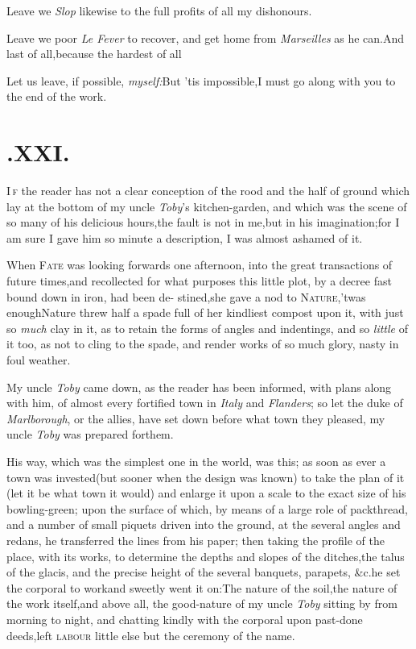 \documentclass{article}
\begin{document}
Leave we \textit{Slop} likewise to the full profits of all my
dishonours.\tsh

Leave we poor \textit{Le Fever} to recover, and get home from
\textit{Marseilles} as he can.\break\tsh And last of
all,\tsk because the hardest of all\tsh{}

Let us leave, if possible, \textit{myself:}\tsh But
’tis impossible,\tsk I must go along with you to the end of
the work.

\section{.\enspace XXI.}

\lettrine{I}{\,f} the reader has not a clear
conception of the rood and the half of ground which lay at the
bottom of my uncle \textit{Toby}’s kitchen-garden, and which
was the scene of so many of his delicious hours,\tsk the fault is
not in me,\tsk but in his imagination;\tsk for I am sure I gave
him so minute a description, I was almost ashamed of it.

When \textsc{Fate} was looking forwards one afternoon,
into the great transactions of future times,\tsk and recollected
for what purposes this little plot, by a decree fast bound down in
iron, had been de- stined,\tsk she gave a nod to
\textsc{Nature},\tsk ’twas enough\tsk Nature threw
half a spade full of her kindliest compost upon it, with just so
\textit{much} clay in it, as to retain the forms of angles and
indentings,\tsk\break
and so \textit{little} of it too, as not to cling
to the spade, and render works of so much glory, nasty in foul
weather.

My uncle \textit{Toby} came down, as the reader has been informed,
with plans along with him, of almost every fortified town in
\textit{Italy} and \textit{Flanders}; so let the duke of
\textit{Marlborough}, or the allies, have set down before what town
they pleased, my uncle \textit{Toby} was prepared for\break them.

His way, which was the simplest one in the world, was this; as
soon as ever a town was invested\tsk (but sooner when 
the design was known) to take the plan\break
of it (let it be what town it would)\break
and enlarge it upon a scale to the exact size of his bowling-green;
upon the surface of which, by means of a large role of packthread,
and a number of small piquets driven into the ground, at the
several angles and redans, he transferred the lines from his paper;
then taking the profile of the place, with its works, to determine
the depths and slopes of the ditches,\tsk the talus of the
glacis, and the precise height of the several banquets, parapets,
\&c.\tsk he set the corporal to work\tsh and sweetly went it
on:\tsh The nature of the soil,\tsk the nature of the
work itself,\tsk and above all, the good-nature of my uncle
\textit{Toby} sitting by from morning to night, and chatting kindly
with the corporal upon past-done deeds,\tsk left
\textsc{labour} little else but the ceremony of the name.
\end{document}
